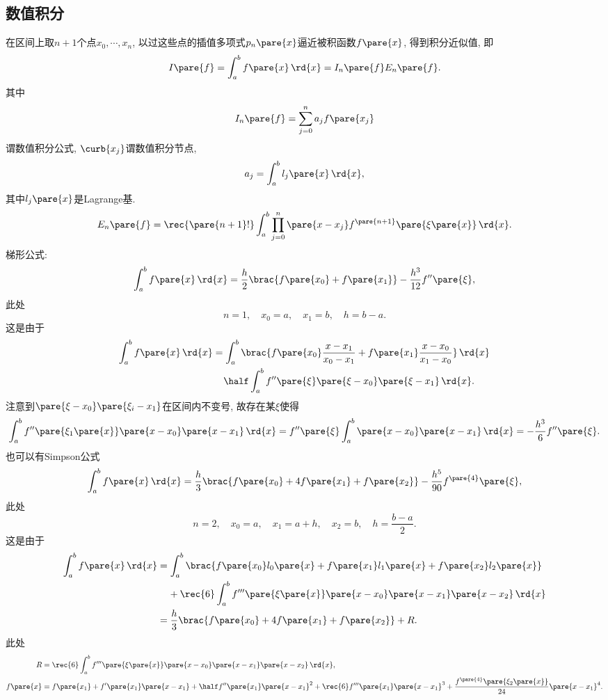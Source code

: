 \documentclass[hidelinks]{ctexart}
\begin{document}



\subsection{数值积分} %
\label{sub:数值积分}

在区间上取$n+1$个点$x_0,\cdots, x_n$, 以过这些点的插值多项式$p_n\pare{x}$逼近被积函数$f\pare{x}$, 得到积分近似值, 即
\[ I\pare{f} = \int_a^b f\pare{x}\,\rd{x} = I_n\pare{f}E_n\pare{f}. \]
其中
\[ I_n\pare{f} = \sum_{j=0}^n a_j f\pare{x_j} \]
谓数值积分公式, $\curb{x_j}$谓数值积分节点,
\[ a_j = \int_a^b l_j\pare{x}\,\rd{x}, \]
其中$l_j\pare{x}$是Lagrange基.
\[ E_n\pare{f} = \rec{\pare{n+1}!} \int_a^b \prod_{j=0}^n \pare{x-x_j}f^{\pare{n+1}}\pare{\xi\pare{x}}\,\rd{x}. \]
梯形公式:
\[ \int_a^b f\pare{x}\,\rd{x} = \frac{h}{2}\brac{f\pare{x_0} + f\pare{x_1}} - \frac{h^3}{12}f''\pare{\xi}, \]
此处
\[ n = 1,\quad x_0 = a,\quad x_1=  b,\quad h = b-a. \]
这是由于
\begin{align*}
    \int_a^b f\pare{x}\,\rd{x} &= \int_a^b \brac{f\pare{x_0} \frac{x-x_1}{x_0 - x_1} + f\pare{x_1}\frac{x-x_0}{x_1 - x_0}}\,\rd{x} \\
    &\phantom{=\ }\half \int_a^b f''\pare{\xi}\pare{\xi - x_0}\pare{\xi - x_1}\,\rd{x}.
\end{align*}
注意到$\pare{\xi-x_0}\pare{\xi_i - x_1}$在区间内不变号, 故存在某$\xi$使得
\[ \int_a^b f''\pare{\xi_1\pare{x}}\pare{x-x_0}\pare{x-x_1}\,\rd{x} = f''\pare{\xi} \int_a^b \pare{x-x_0}\pare{x-x_1}\,\rd{x} = -\frac{h^3}{6}f''\pare{\xi}. \]
也可以有Simpson公式
\[ \int_a^b f\pare{x}\,\rd{x} = \frac{h}{3}\brac{f\pare{x_0} + 4f\pare{x_1} + f\pare{x_2}} - \frac{h^5}{90}f^{\pare{4}}\pare{\xi}, \]
此处
\[ n=2,\quad x_0 = a,\quad x_1 = a+h,\quad x_2 = b,\quad h = \frac{b-a}{2}. \]
这是由于
\begin{align*}
    \int_a^b f\pare{x}\,\rd{x} &= \int_a^b \brac{f\pare{x_0} l_0\pare{x} + f\pare{x_1} l_1\pare{x} + f\pare{x_2}l_2\pare{x}} \\
    & \phantom{=\ } + \rec{6} \int_a^b f'''\pare{\xi\pare{x}} \pare{x-x_0}\pare{x-x_1}\pare{x-x_2} \,\rd{x} \\
    &= \frac{h}{3}\brac{f\pare{x_0} + 4f\pare{x_1} + f\pare{x_2}} + R.
\end{align*}
此处
\begin{align*}
    R &= \rec{6} \int_a^b f'''\pare{\xi\pare{x}} \pare{x-x_0}\pare{x-x_1}\pare{x-x_2} \,\rd{x}, \\
    f\pare{x} &= f\pare{x_1} + f'\pare{x_1}\pare{x-x_1} + \half f''\pare{x_1}\pare{x-x_1}^2 + \rec{6}f'''\pare{x_1}\pare{x-x_1}^3 + \frac{f^{\pare{4}}\pare{\xi_2\pare{x}}}{24}\pare{x-x_1}^4.
\end{align*}
\end{document}
